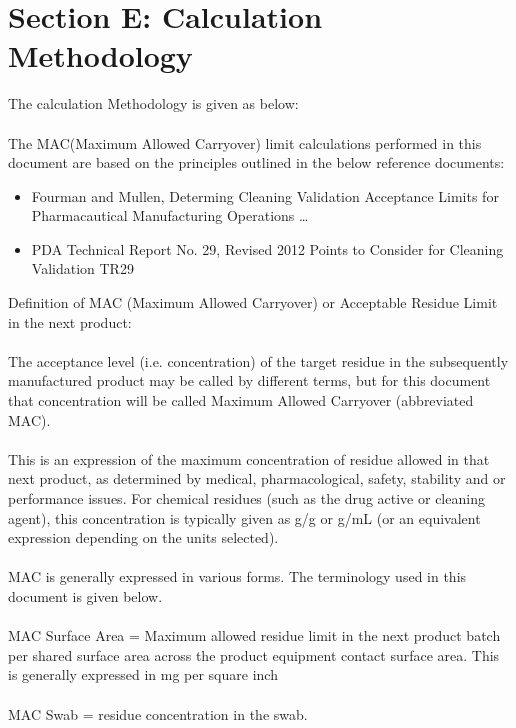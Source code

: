 \documentclass{article}
\begin{document}
        \section{Section E: Calculation Methodology}
        The calculation Methodology is given as below:\\\\
        The MAC(Maximum Allowed Carryover) limit calculations performed in this document are based on the principles outlined in the below reference documents:\\
        \begin{itemize}
        \item Fourman and Mullen, Determing Cleaning Validation Acceptance Limits for Pharmacautical Manufacturing Operations \dots{}
        \item PDA Technical Report No. 29, Revised 2012 Points to Consider for Cleaning Validation TR29
        \end{itemize}
        Definition of MAC (Maximum Allowed Carryover) or Acceptable Residue Limit in the next product:\\\\
        The acceptance level (i.e. concentration) of the target residue in the subsequently manufactured product may be called by different terms, but for this document that concentration will be called Maximum Allowed Carryover (abbreviated MAC).\\\\
        This is an expression of the maximum concentration of residue allowed in that next product, as determined by medical, pharmacological, safety, stability and
        or performance issues. For chemical residues (such as the drug active or cleaning agent), this concentration is typically given
        as {\textmu}g/g or {\textmu}g/mL (or an equivalent expression depending on the units selected).\\\\
        MAC is generally expressed in various forms. The terminology used in this document is given below.\\\\
        MAC Surface Area = Maximum allowed residue limit in the next product batch per shared surface area across the product equipment contact surface area. This is generally expressed in mg per square inch\\\\
        MAC Swab = residue concentration in the swab.\\\\
\end{document}

